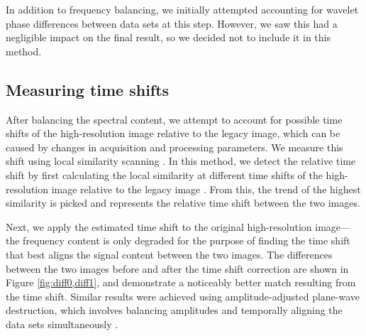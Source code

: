     In addition to frequency balancing, we initially attempted accounting for wavelet phase differences between data sets at this step. 
    However, we saw this had a negligible impact on the final result, so we decided not to include it in this method.
    

\subsection{Measuring time shifts}

    After balancing the spectral content, we attempt to account for possible time shifts of the high-resolution image relative to the legacy image, which can be caused by changes in acquisition and processing parameters. 
    We measure this shift using local similarity scanning \cite[]{attr, timelapse}. 
    In this method, we detect the relative time shift by first calculating the local similarity at different time shifts of the high-resolution image relative to the legacy image \cite[]{timelapse}. 
    From this, the trend of the highest similarity is picked and represents the relative time shift between the two images.
    
    Next, we apply the estimated time shift to the original high-resolution image---the frequency content is only degraded for the purpose of finding the time shift that best aligns the signal content between the two images.
    The differences between the two images before and after the time shift correction are shown in Figure \ref{fig:diff0,diff1}, and demonstrate a noticeably better match resulting from the time shift. 
    Similar results were achieved using amplitude-adjusted plane-wave destruction, which involves balancing amplitudes and temporally aligning the data sets simultaneously \cite[]{apwd}.


